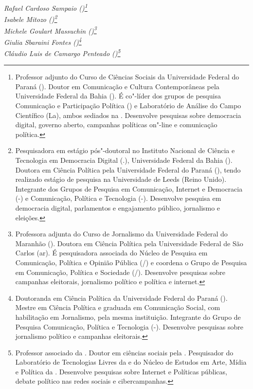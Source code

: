 \begin{flushright}
\emph{Rafael Cardoso Sampaio ()\footnote{Professor adjunto do Curso de Ciências Sociais da Universidade Federal
do Paraná (). Doutor em Comunicação e Cultura Contemporâneas pela
Universidade Federal da Bahia (). É co"-líder dos grupos de pesquisa
Comunicação e Participação Política () e Laboratório de Análise do
Campo Científico (La), ambos sediados na . Desenvolve pesquisas
sobre democracia digital, governo aberto, campanhas políticas on"-line e
comunicação política.}\\Isabele Mitozo ()\footnote{Pesquisadora em estágio pós"-doutoral no Instituto Nacional de Ciência e
Tecnologia em Democracia Digital (.), Universidade Federal da
Bahia (). Doutora em Ciência Política pela Universidade Federal do
Paraná (), tendo realizado estágio de pesquisa na Universidade de
Leeds (Reino Unido). Integrante dos Grupos de Pesquisa em Comunicação,
Internet e Democracia (-) e Comunicação, Política e Tecnologia
(-). Desenvolve pesquisa em democracia digital, parlamentos e
engajamento público, jornalismo e eleições.}\\Michele Goulart
Massuchin ()\footnote{Professora adjunta do Curso de Jornalismo da Universidade Federal do
Maranhão (). Doutora em Ciência Política pela Universidade Federal
de São Carlos (ar). É pesquisadora associada do Núcleo de Pesquisa
em Comunicação, Política e Opinião Pública (/) e coordena o
Grupo de Pesquisa em Comunicação, Política e Sociedade (/).
Desenvolve pesquisas sobre campanhas eleitorais, jornalismo político e
política e internet.}\\Giulia Sbaraini Fontes ()\footnote{Doutoranda em Ciência Política da Universidade Federal do Paraná ().
Mestre em Ciência Política e graduada em Comunicação Social, com
habilitação em Jornalismo, pela mesma instituição. Integrante do Grupo
de Pesquisa Comunicação, Política e Tecnologia (-). Desenvolve
pesquisas sobre jornalismo político e campanhas eleitorais.}\\Cláudio Luis de Camargo Penteado ()\footnote{Professor associado da . Doutor em ciências sociais pela  .
Pesquisador do Laboratório de Tecnologias Livres da  e do Núcleo de
Estudos em Arte, Mídia e Política da  . Desenvolve pesquisas sobre
Internet e Políticas públicas, debate político nas redes sociais e
cibercampanhas.}}
\end{flushright}

